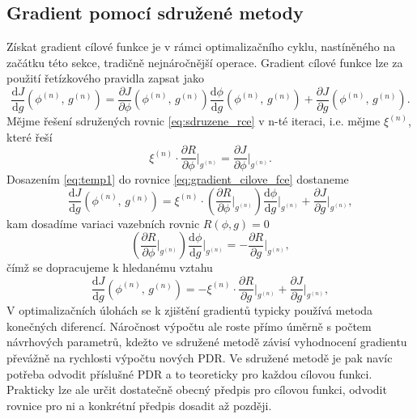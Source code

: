 \subsection{Gradient pomocí sdružené metody}
Získat gradient cílové funkce je v rámci optimalizačního cyklu, nastíněného na začátku této sekce, tradičně nejnáročnější operace. Gradient cílové funkce lze za použití řetízkového pravidla zapsat jako
\begin{equation}\label{eq:gradient_cilove_fce}
\dfrac
{\mathrm{d}J}
{\mathrm{d}g} (\phi^{(n)}, \, g^{(n)})
=
\dfrac
{\partial J}
{\partial \phi }(\phi^{(n)}, \, g^{(n)})
\dfrac
{\mathrm{d}\phi}
{\mathrm{d}g}(\phi^{(n)}, \, g^{(n)})
+
\dfrac
{\partial J}
{\partial g}(\phi^{(n)}, \, g^{(n)}).
\end{equation}
Mějme řešení sdružených rovnic \ref{eq:sdruzene_rce} v n-té iteraci, i.e. mějme $ \xi^{(n)} $, které řeší
\begin{equation}\label{eq:temp1}
\xi^{(n)} \cdot \dfrac{\partial R}{\partial \phi} \Bigr|_{g^{(n)}}=\dfrac{\partial J}{\partial \phi}\Bigr|_{g^{(n)}}.
\end{equation}
Dosazením \ref{eq:temp1} do rovnice \ref{eq:gradient_cilove_fce} dostaneme 
\begin{equation*}
\dfrac{\mathrm{d}J}
{\mathrm{d}g} (\phi^{(n)}, \, g^{(n)})
=
\xi^{(n)} 
\cdot 
\left(
\dfrac{\partial R}
{\partial \phi}\Bigr|_{g^{(n)}}
\right)
\dfrac{\mathrm{d}\phi}
{\mathrm{d}g}\Bigr|_{g^{(n)}}
+
\dfrac{\partial J}
{\partial g}\Bigr|_{g^{(n)}},
\end{equation*}
kam dosadíme variaci vazebních rovnic $ R(\phi,g)=0 $
\begin{equation*}
\left(
\dfrac{\partial R}
{\partial \phi}\Bigr|_{g^{(n)}}
\right)
\dfrac{\mathrm{d}\phi}
{\mathrm{d}g}\Bigr|_{g^{(n)}}
=
-\dfrac{\partial R}
{\partial g}\Bigr|_{g^{(n)}},
\end{equation*}
čímž se dopracujeme k hledanému vztahu
\begin{equation*}
\dfrac{\mathrm{d}J}
{\mathrm{d}g} (\phi^{(n)}, \, g^{(n)})
=
-\xi^{(n)} 
\cdot 
\dfrac{\partial R}
{\partial g}\Bigr|_{g^{(n)}}
+
\dfrac{\partial J}
{\partial g}\Bigr|_{g^{(n)}},
\end{equation*}
V optimalizačních úlohách se k zjištění gradientů typicky používá metoda konečných diferencí. Náročnost výpočtu ale roste přímo úměrně s počtem návrhových parametrů, kdežto ve sdružené metodě závisí vyhodnocení gradientu převážně na rychlosti výpočtu nových PDR. Ve sdružené metodě je pak navíc potřeba odvodit příslušné PDR a to teoreticky pro každou cílovou funkci. Prakticky lze ale určit dostatečně obecný předpis pro cílovou funkci, odvodit rovnice pro ni a konkrétní předpis dosadit až později.

